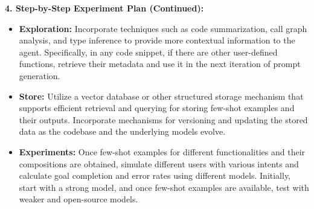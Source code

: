 \begin{tcolorbox}[colback=blue!5!white,colframe=blue!75!black,title=\textbf{Autoprompting: Generate Diverse Few-Shot Examples for Any Application (Part 2)}]
\small{
\textbf{4. Step-by-Step Experiment Plan (Continued):}
\begin{itemize}
    \item \textbf{Exploration:} Incorporate techniques such as code summarization, call graph analysis, and type inference to provide more contextual information to the agent. Specifically, in any code snippet, if there are other user-defined functions, retrieve their metadata and use it in the next iteration of prompt generation.
    \item \textbf{Store:} Utilize a vector database or other structured storage mechanism that supports efficient retrieval and querying for storing few-shot examples and their outputs. Incorporate mechanisms for versioning and updating the stored data as the codebase and the underlying models evolve.
    \item \textbf{Experiments:} Once few-shot examples for different functionalities and their compositions are obtained, simulate different users with various intents and calculate goal completion and error rates using different models. Initially, start with a strong model, and once few-shot examples are available, test with weaker and open-source models.
\end{itemize}

}
\end{tcolorbox}
